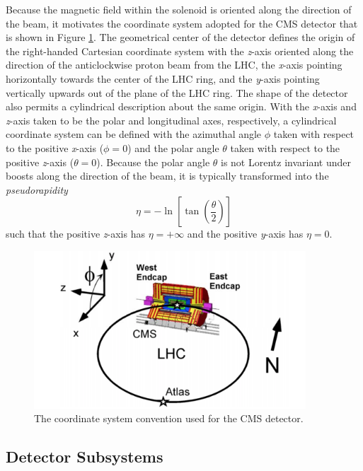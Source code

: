 Because the magnetic field within the solenoid is oriented along the direction of the beam, it motivates the coordinate system adopted for the CMS detector that is shown in Figure \ref{fig:CMS_coord_sys}. The geometrical center of the detector defines the origin of the right-handed Cartesian coordinate system with the \textit{z}-axis oriented along the direction of the anticlockwise proton beam from the LHC, the \textit{x}-axis pointing horizontally towards the center of the LHC ring, and the \textit{y}-axis pointing vertically upwards out of the plane of the LHC ring. The shape of the detector also permits a cylindrical description about the same origin. With the \textit{x}-axis and \textit{z}-axis taken to be the polar and longitudinal axes, respectively, a cylindrical coordinate system can be defined with the azimuthal angle $\phi$ taken with respect to the positive \textit{x}-axis ($\phi = 0$) and the polar angle $\theta$ taken with respect to the positive \textit{z}-axis ($\theta = 0$). Because the polar angle $\theta$ is not Lorentz invariant under boosts along the direction of the beam, it is typically transformed into the \textit{pseudorapidity}
\begin{equation}
  \eta = -\ln\left[\tan\left(\frac{\theta}{2}\right)\right]
\end{equation}
such that the positive \textit{z}-axis has $\eta = + \infty$ and the positive \textit{y}-axis has $\eta = 0$.

\begin{figure}[htbp]
  \centering
    \includegraphics[width=4in]{images/CMS_coord_sys}
    \caption[Coordinate System of the CMS Detector]{The coordinate system convention used for the CMS detector.\cite{CMSCoordSys}}
    \label{fig:CMS_coord_sys}
\end{figure}

\subsection{Detector Subsystems}

